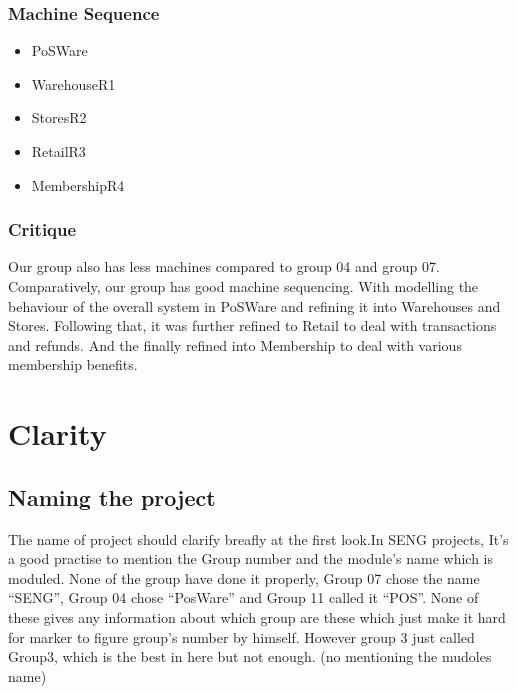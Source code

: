 \subsubsection{Machine Sequence}
\label{machinesequence}

\begin{itemize}
\item PoSWare

\item WarehouseR1

\item StoresR2

\item RetailR3

\item MembershipR4

\end{itemize}

\subsubsection{Critique}
\label{critique}

Our group also has less machines compared to group 04 and group 07. Comparatively, our group has good machine sequencing. With modelling the behaviour of the overall system in PoSWare and refining it into Warehouses and Stores. Following that, it was further refined to Retail to deal with transactions and refunds. And the finally refined into Membership to deal with various membership benefits.

\section{Clarity}
\label{clarity}

\subsection{Naming the project}
\label{namingtheproject}

The name of project should clarify breafly at the first look.In SENG projects, It's a good practise to mention the Group number and the module's name which is moduled. None of the group have done it properly, Group 07 chose the name “SENG”, Group 04 chose “PosWare” and Group 11 called it “POS”. None of these gives any information about which group are these which just make it hard for marker to figure group's number by himself. However group 3 just called Group3, which is the best in here but not enough. (no mentioning the mudoles name)


